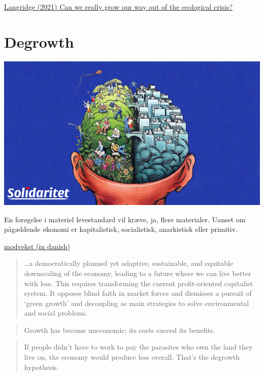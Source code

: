 \documentclass[
]{book}
\begin{document}
\href{https://blogs.bath.ac.uk/cds/2021/05/18/can-we-really-grow-our-way-out-of-the-ecological-crisis/}{Langridge (2021) Can we really grow our way out of the ecological crisis?}

\hypertarget{degrowth}{%
\chapter{Degrowth}\label{degrowth}}

\includegraphics{fig/degrowth_brain.png}

En forøgelse i materiel levestandard vil kræve, ja, flere materialer. Uanset om pågældende økonomi er kapitalistisk, socialistisk, anarkistisk eller primitiv.

\href{https://solidaritet.dk/modvaekst-socialisme-uden-vaekst/}{modvekst (in danish)}

\begin{quote}
\ldots a democratically planned yet adaptive, sustainable, and equitable downscaling of the
economy, leading to a future where we can live better with less. This requires transforming the
current profit-oriented capitalist system. It opposes blind faith in market forces and dismisses a
pursuit of `green growth' and decoupling as main strategies to solve environmental and social
problems.
\end{quote}

\begin{quote}
Growth has become uneconomic; its costs exceed its benefits.
\end{quote}

\begin{quote}
If people didn't have to work to pay the parasites who own the land they live on, the economy would produce less overall. That's the degrowth hypothesis.
\end{quote}
\end{document}
